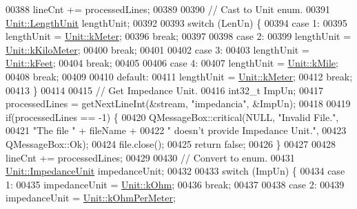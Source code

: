 \begin{DoxyCode}
00388   lineCnt += processedLines;
00389 
00390   \textcolor{comment}{// Cast to Unit enum.}
00391   \hyperlink{class_unit_a8c8921f7b225ad6063b1cb573425b9a0}{Unit::LengthUnit} lengthUnit;
00392 
00393   \textcolor{keywordflow}{switch} (LenUn) \{
00394   \textcolor{keywordflow}{case} 1:
00395     lengthUnit = \hyperlink{class_unit_a8c8921f7b225ad6063b1cb573425b9a0abfa41ebe7ee649a1f02c9b8ae570434b}{Unit::kMeter};
00396     \textcolor{keywordflow}{break};
00397 
00398   \textcolor{keywordflow}{case} 2:
00399     lengthUnit = \hyperlink{class_unit_a8c8921f7b225ad6063b1cb573425b9a0a1c04f3dd196dbe1832a2658215b0d919}{Unit::kKiloMeter};
00400     \textcolor{keywordflow}{break};
00401 
00402   \textcolor{keywordflow}{case} 3:
00403     lengthUnit = \hyperlink{class_unit_a8c8921f7b225ad6063b1cb573425b9a0a9ac9b167b0ebce477fb53d6ace04ddc8}{Unit::kFeet};
00404     \textcolor{keywordflow}{break};
00405 
00406   \textcolor{keywordflow}{case} 4:
00407     lengthUnit = \hyperlink{class_unit_a8c8921f7b225ad6063b1cb573425b9a0a2ebde742068bbee0510de32fbb4cd724}{Unit::kMile};
00408     \textcolor{keywordflow}{break};
00409 
00410   \textcolor{keywordflow}{default}:
00411     lengthUnit = \hyperlink{class_unit_a8c8921f7b225ad6063b1cb573425b9a0abfa41ebe7ee649a1f02c9b8ae570434b}{Unit::kMeter};
00412     \textcolor{keywordflow}{break};
00413   \}
00414 
00415   \textcolor{comment}{// Get Impedance Unit.}
00416   int32\_t ImpUn;
00417   processedLines = getNextLineInt(&stream, \textcolor{stringliteral}{"impedancia"}, &ImpUn);
00418 
00419   \textcolor{keywordflow}{if}(processedLines == -1) \{
00420     QMessageBox::critical(NULL, \textcolor{stringliteral}{"Invalid File."},
00421                           \textcolor{stringliteral}{"The file "} + fileName +
00422                           \textcolor{stringliteral}{" doesn't provide Impedance Unit."},
00423                           QMessageBox::Ok);
00424     file.close();
00425     \textcolor{keywordflow}{return} \textcolor{keyword}{false};
00426   \}
00427 
00428   lineCnt += processedLines;
00429 
00430   \textcolor{comment}{// Convert to enum.}
00431   \hyperlink{class_unit_a3747e779c805df24a71961290be3fbdf}{Unit::ImpedanceUnit} impedanceUnit;
00432 
00433   \textcolor{keywordflow}{switch} (ImpUn) \{
00434   \textcolor{keywordflow}{case} 1:
00435     impedanceUnit = \hyperlink{class_unit_a3747e779c805df24a71961290be3fbdfa6b9c74d1763eefbaf751eeecff0bd9da}{Unit::kOhm};
00436     \textcolor{keywordflow}{break};
00437 
00438   \textcolor{keywordflow}{case} 2:
00439     impedanceUnit = \hyperlink{class_unit_a3747e779c805df24a71961290be3fbdfa35e9ca44deb5a35fdb576111cf0db336}{Unit::kOhmPerMeter};

\end{DoxyCode}
